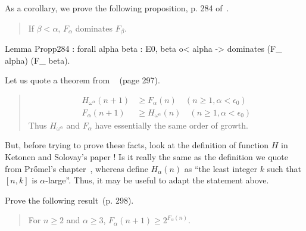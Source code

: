 As a corollary, we prove the following proposition, p. 284 of~\cite{KS81}.

\begin{quote}
  If $\beta<\alpha$, $F_\alpha$ dominates $F_\beta$.
\end{quote}

\begin{Coqsrc}
Lemma Propp284 : forall alpha beta : E0, 
   beta o< alpha -> dominates (F_ alpha) (F_ beta).
\end{Coqsrc}


\begin{exercise}
Let us quote a theorem from ~\cite{KS81} (page 297).

\begin{quote}
\begin{align*}
  H_{\omega^\alpha}(n+1) &\geq F_{\alpha}(n) \quad (n\geq 1, \alpha<\epsilon_0) \\
 F_{\alpha}(n+1) &\geq H_{\omega^\alpha}(n) \quad (n\geq 1, \alpha<\epsilon_0) 
\end{align*}
Thus $H_{\omega^\alpha}$ and $F_{\alpha}$ have essentially the same order of growth.

\end{quote}

 But, before trying to prove these facts, look at the definition of function $H$ in Ketonen and Solovay's paper ! Is it really the same as the definition we quote from Pr{\H o}mel's chapter~\cite{Promel2013},
whereas \cite{KS81} define $H_\alpha(n)$ as ``the least integer $k$ such that $[n,k]$ is $\alpha$-large''. Thus, it may be useful to adapt the statement above.



\end{exercise}


\begin{exercise}
Prove the following result~\cite{KS81}(p. 298).

\begin{quote}
   For $n\geq 2$ and $\alpha \geq 3$, $F_\alpha(n+1)\geq 2^{F_\alpha(n)}$.
\end{quote}
\end{exercise}




